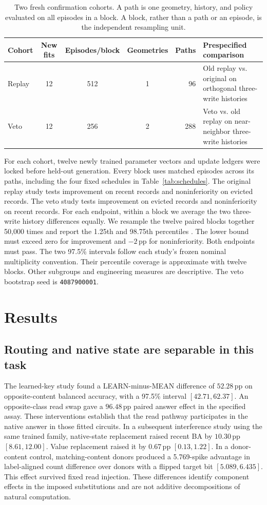 \documentclass[10pt]{article}
\newcommand{\pp}{\,\mathrm{pp}}
\begin{document}
\begin{table}[htbp]
\centering
\caption{Two fresh confirmation cohorts. A path is one geometry, history, and policy evaluated on all episodes in a block. A block, rather than a path or an episode, is the independent resampling unit.}
\label{tab:cohorts}
\small
\begin{tabularx}{\linewidth}{@{}lcccrX@{}}
\toprule
Cohort & New fits & Episodes/block & Geometries & Paths & Prespecified comparison \\
\midrule
Replay & 12 & 512 & 1 & 96 & Old replay vs. original on orthogonal three-write histories \\
Veto & 12 & 256 & 2 & 288 & Veto vs. old replay on near-neighbor three-write histories \\
\bottomrule
\end{tabularx}
\end{table}

For each cohort, twelve newly trained parameter vectors and update ledgers were locked before held-out generation. Every block uses matched episodes across its paths, including the four fixed schedules in Table~\ref{tab:schedules}. The original replay study tests improvement on recent records and noninferiority on evicted records. The veto study tests improvement on evicted records and noninferiority on recent records. For each endpoint, within a block we average the two three-write history differences equally. We resample the twelve paired blocks together 50,000 times and report the 1.25th and 98.75th percentiles \cite{efron1979}. The lower bound must exceed zero for improvement and $-2\pp$ for noninferiority. Both endpoints must pass. The two 97.5\% intervals follow each study's frozen nominal multiplicity convention. Their percentile coverage is approximate with twelve blocks. Other subgroups and engineering measures are descriptive. The veto bootstrap seed is \texttt{4087900001}.

\section{Results}
\subsection{Routing and native state are separable in this task}
The learned-key study found a LEARN-minus-MEAN difference of $52.28\pp$ on opposite-content balanced accuracy, with a 97.5\% interval $[42.71,62.37]$. An opposite-class read swap gave a $96.48\pp$ paired answer effect in the specified assay. These interventions establish that the read pathway participates in the native answer in those fitted circuits. In a subsequent interference study using the same trained family, native-state replacement raised recent BA by $10.30\pp$ $[8.61,12.00]$. Value replacement raised it by $0.67\pp$ $[0.13,1.22]$. In a donor-content control, matching-content donors produced a 5.769-spike advantage in label-aligned count difference over donors with a flipped target bit $[5.089,6.435]$. This effect survived fixed read injection. These differences identify component effects in the imposed substitutions and are not additive decompositions of natural computation.
\end{document}
